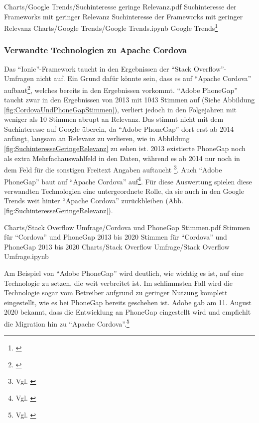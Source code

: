 \begin{alexfigurewithnotebook}{Charts/Google Trends/Suchinteresse geringe Relevanz.pdf}
	{Suchinteresse der Frameworks mit geringer Relevanz}
	{Suchinteresse der Frameworks mit geringer Relevanz}
	{Charts/Google Trends/Google Trends.ipynb}
	{Google Trends\footnote{\cite{FaqPhoneGapDocs}}}
	\label{fig:SuchinteresseGeringeRelevanz}

\end{alexfigurewithnotebook}

\subsubsection{Verwandte Technologien zu Apache Cordova} Das \enquote{Ionic}-Framework taucht in den Ergebnissen der \enquote{Stack Overflow}-Umfragen nicht auf.
Ein Grund dafür könnte sein, dass es auf \enquote{Apache Cordova} aufbaut\footnote{\cite{TheLastWordOnCordovaAndPhoneGap}}, welches bereits in den Ergebnissen vorkommt.
\enquote{Adobe PhoneGap} taucht zwar in den Ergebnissen von 2013 mit 1043 Stimmen auf (Siehe Abbildung \ref{fig:CordovaUndPhoneGapStimmen}), verliert jedoch in den Folgejahren mit weniger als 10 Stimmen abrupt an Relevanz.
Das stimmt nicht mit dem Suchinteresse auf Google überein, da \enquote{Adobe PhoneGap} dort erst ab 2014 anfängt, langsam an Relevanz zu verlieren, wie in Abbildung \ref{fig:SuchinteresseGeringeRelevanz} zu sehen ist.
2013 existierte PhoneGap noch als extra Mehrfachauswahlfeld in den Daten, während es ab 2014 nur noch in dem Feld für die sonstigen Freitext Angaben auftaucht \footnote{Vgl. \cite{StackOverflowInsights}}.
Auch \enquote{Adobe PhoneGap} baut auf \enquote{Apache Cordova} auf\footnote{Vgl.
\cite{FaqPhoneGapDocs}}.
Für diese Auswertung spielen diese verwandten Technologien eine untergeordnete Rolle, da sie auch in den Google Trends weit hinter \enquote{Apache Cordova} zurückbleiben (Abb.
\ref{fig:SuchinteresseGeringeRelevanz}).

\begin{alexfigurewithnotebook}{Charts/Stack Overflow Umfrage/Cordova und PhoneGap Stimmen.pdf}
	{Stimmen für \enquote{Cordova} und PhoneGap 2013 bis 2020}
	{Stimmen für \enquote{Cordova} und PhoneGap 2013 bis 2020}
	{Charts/Stack Overflow Umfrage/Stack Overflow Umfrage.ipynb}
	{}
	\label{fig:CordovaUndPhoneGapStimmen}

\end{alexfigurewithnotebook}

Am Beispiel von \enquote{Adobe PhoneGap} wird deutlich, wie wichtig es ist, auf eine Technologie zu setzen, die weit verbreitet ist.
Im schlimmsten Fall wird die Technologie sogar vom Betreiber aufgrund zu geringer Nutzung komplett eingestellt, wie es bei PhoneGap bereits geschehen ist.
Adobe gab am 11.
August 2020 bekannt, dass die  Entwicklung an PhoneGap eingestellt wird und empfiehlt die Migration hin zu \enquote{Apache Cordova}.\footnote{Vgl. \cite{UpdateForCustomersUsingPhoneGapAndPhoneGapBuild}}

